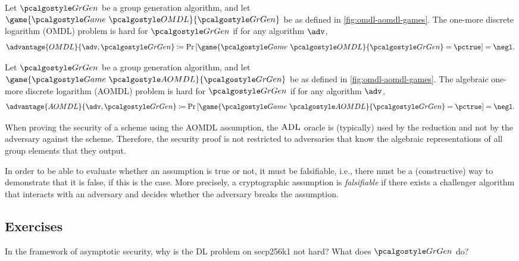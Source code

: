 \begin{definition}
  Let $\grgen$ be a group generation algorithm, and let $\game{\Game~\algo{OMDL}}{\grgen}$ be as defined in \autoref{fig:omdl-aomdl-games}.
  The one-more discrete logarithm (OMDL) problem is hard for $\grgen$ if for any \ppt algorithm $\adv$,
  \[
  \advantage{OMDL}{\adv, \grgen} \defeq \pr{\game{\Game~\algo{OMDL}}{\grgen} = \pctrue} = \negl.
  \]
\end{definition}

\begin{definition}
  Let $\grgen$ be a group generation algorithm, and let $\game{\Game~\algo{AOMDL}}{\grgen}$ be as defined in \autoref{fig:omdl-aomdl-games}.
  The algebraic one-more discrete logarithm (AOMDL) problem is hard for $\grgen$ if for any \ppt algorithm $\adv$,
  \[
  \advantage{AOMDL}{\adv, \grgen} \defeq \pr{\game{\Game~\algo{AOMDL}}{\grgen} = \pctrue} = \negl.
  \]
\end{definition}

\begin{remark}
  When proving the security of a scheme using the AOMDL assumption, the ${\normalfont\textsc{ADL}}$ oracle is (typically) used by the reduction and not by the adversary against the scheme.
  Therefore, the security proof is not restricted to adversaries that know the algebraic representations of all group elements that they output.
\end{remark}

\begin{remark}
  In order to be able to evaluate whether an assumption is true or not, it must be falsifiable, i.e., there must be a (constructive) way to demonstrate that it is false, if this is the case.
  More precisely, a cryptographic assumption is \emph{falsifiable} if there exists a \ppt challenger algorithm that interacts with an adversary and decides whether the adversary breaks the assumption.
\end{remark}

\subsection{Exercises}

\begin{exercise}
  In the framework of asymptotic security, why is the DL problem on secp256k1 not hard? What does $\grgen$ do?
\end{exercise}

